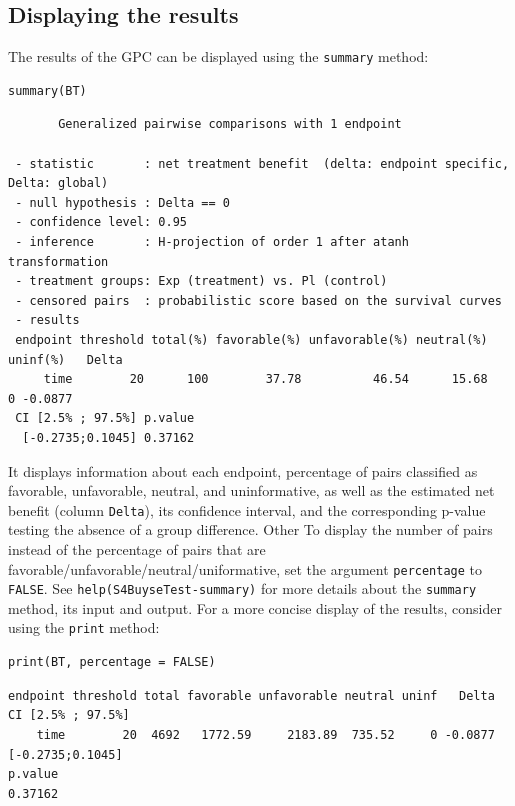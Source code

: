 \documentclass[12pt]{article}
\begin{document}
\subsection{Displaying the results}
\label{sec:orge3e2bb6}

The results of the GPC can be displayed using the \texttt{summary} method:
\lstset{language=r,label= ,caption= ,captionpos=b,numbers=none}
\begin{lstlisting}
summary(BT)
\end{lstlisting}

\begin{verbatim}
       Generalized pairwise comparisons with 1 endpoint

 - statistic       : net treatment benefit  (delta: endpoint specific, Delta: global) 
 - null hypothesis : Delta == 0 
 - confidence level: 0.95 
 - inference       : H-projection of order 1 after atanh transformation 
 - treatment groups: Exp (treatment) vs. Pl (control) 
 - censored pairs  : probabilistic score based on the survival curves
 - results
 endpoint threshold total(%) favorable(%) unfavorable(%) neutral(%) uninf(%)   Delta
     time        20      100        37.78          46.54      15.68        0 -0.0877
 CI [2.5% ; 97.5%] p.value 
  [-0.2735;0.1045] 0.37162
\end{verbatim}


It displays information about each endpoint, percentage of pairs
classified as favorable, unfavorable, neutral, and uninformative, as
well as the estimated net benefit (column \texttt{Delta}), its confidence
interval, and the corresponding p-value testing the absence of a group
difference. Other To display the number of pairs instead of the
percentage of pairs that are
favorable/unfavorable/neutral/uniformative, set the argument
\texttt{percentage} to \texttt{FALSE}. See \texttt{help(S4BuyseTest-summary)} for more
details about the \texttt{summary} method, its input and output. For a more
concise display of the results, consider using the \texttt{print} method:
\lstset{language=r,label= ,caption= ,captionpos=b,numbers=none}
\begin{lstlisting}
print(BT, percentage = FALSE)
\end{lstlisting}

\begin{verbatim}
endpoint threshold total favorable unfavorable neutral uninf   Delta CI [2.5% ; 97.5%]
    time        20  4692   1772.59     2183.89  735.52     0 -0.0877  [-0.2735;0.1045]
p.value
0.37162
\end{verbatim}
\end{document}
